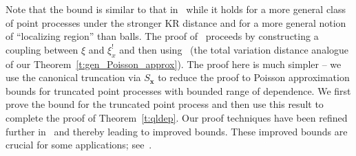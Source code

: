 \documentclass[10pt]{amsart}
\theoremstyle{definition}\newtheorem{defi}[theo]{Definition}\newtheorem{rema}[theo]{Remark}\newtheorem{exam}[theo]{Example}\newtheorem{exem}[theo]{Example}\newtheorem{nota}[theo]{Notation}
\newcommand{\bx}{\mathbf{x}}
\begin{document}
Note that the bound is similar to that in~\cite[Theorem~3.3]{Otto2020} while it holds for a more general class of point processes under the stronger KR distance {and for a {more} general notion of ``localizing region'' than balls}. The proof of~\cite[Theorem~3.3]{Otto2020} proceeds by constructing a coupling between $\xi$ and $\xi^{!}_{x}$ and then using~\cite[Theorem~2.6]{Barbour1992} (the total variation distance analogue of our Theorem~\ref{t:gen_Poisson_approx}). The proof here is much simpler -- we use the canonical truncation via $S_{\bx}$ to reduce the proof to Poisson approximation bounds for truncated point processes with bounded range of dependence. We first prove the bound for the truncated point process and then use this result to complete the proof of Theorem~\ref{t:qldep}. Our proof techniques have been refined further in~\cite[Theorem~8]{Otto2021} and thereby leading to improved bounds. These improved bounds are crucial for some applications; see~\cite{Otto2021}.
\end{document}
